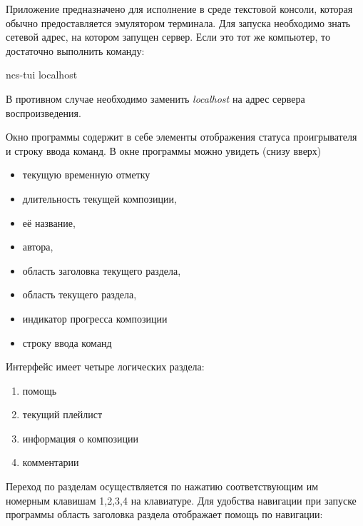 

Приложение предназначено для исполнение в среде текстовой консоли, которая обычно
предоставляется эмулятором терминала. Для запуска необходимо знать
сетевой адрес, на котором запущен сервер. Если это тот же компьютер,
то достаточно выполнить команду:

\begin{bashcode}
  ncs-tui localhost
\end{bashcode}

В противном случае необходимо заменить \textit{localhost} на адрес
сервера воспроизведения.

Окно программы содержит в себе элементы отображения статуса
проигрывателя и строку ввода команд. В окне программы можно увидеть
(снизу вверх)

\begin{itemize}

\item{ текущую временную отметку}
\item{ длительность текущей композиции, }
\item{ её название,}
\item{ автора, }
\item{ область заголовка текущего раздела,}
\item{ область текущего раздела,}
\item{ индикатор прогресса композиции}
\item{ строку ввода команд }

\end{itemize}


Интерфейс имеет четыре логических раздела:
\begin{enumerate}
\item{ помощь }
\item{ текущий плейлист }
\item{ информация о композиции }
\item{ комментарии }
\end{enumerate}

Переход по разделам осуществляется по нажатию соответствующим им
номерным клавишам 1,2,3,4 на клавиатуре. Для удобства
навигации при запуске программы область заголовка раздела отображает
помощь по навигации:  

